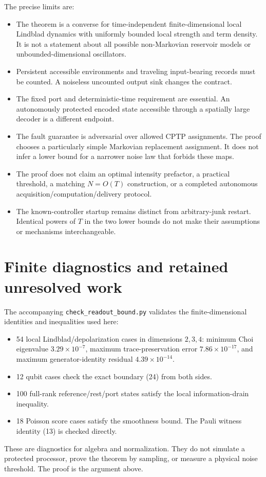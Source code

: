 \documentclass[11pt]{article}
\begin{document}
The precise limits are:
\begin{itemize}
\item The theorem is a converse for time-independent finite-dimensional
local Lindblad dynamics with uniformly bounded local strength and term
density. It is not a statement about all possible non-Markovian
reservoir models or unbounded-dimensional oscillators.
\item Persistent accessible environments and traveling input-bearing
records must be counted. A noiseless uncounted output sink changes the
contract.
\item The fixed port and deterministic-time requirement are essential.
An autonomously protected encoded state accessible through a spatially
large decoder is a different endpoint.
\item The fault guarantee is adversarial over allowed CPTP assignments.
The proof chooses a particularly simple Markovian replacement
assignment. It does not infer a lower bound for a narrower noise law
that forbids these maps.
\item The proof does not claim an optimal intensity prefactor, a practical
threshold, a matching \(N=O(T)\) construction, or a completed autonomous
acquisition/computation/delivery protocol.
\item The known-controller startup remains distinct from arbitrary-junk
restart. Identical powers of \(T\) in the two lower bounds do not make
their assumptions or mechanisms interchangeable.
\end{itemize}

\section{Finite diagnostics and retained unresolved work}

The accompanying \texttt{check\_readout\_bound.py} validates the
finite-dimensional identities and inequalities used here:
\begin{itemize}
\item 54 local Lindblad/depolarization cases in dimensions \(2,3,4\):
minimum Choi eigenvalue \(3.29\times10^{-7}\), maximum trace-preservation
error \(7.86\times10^{-17}\), and maximum generator-identity residual
\(4.39\times10^{-14}\).
\item 12 qubit cases check the exact boundary (24) from both sides.
\item 100 full-rank reference/rest/port states satisfy the local
information-drain inequality.
\item 18 Poisson score cases satisfy the smoothness bound. The Pauli
witness identity (13) is checked directly.
\end{itemize}
These are diagnostics for algebra and normalization. They do not
simulate a protected processor, prove the theorem by sampling, or
measure a physical noise threshold. The proof is the argument above.
\end{document}
